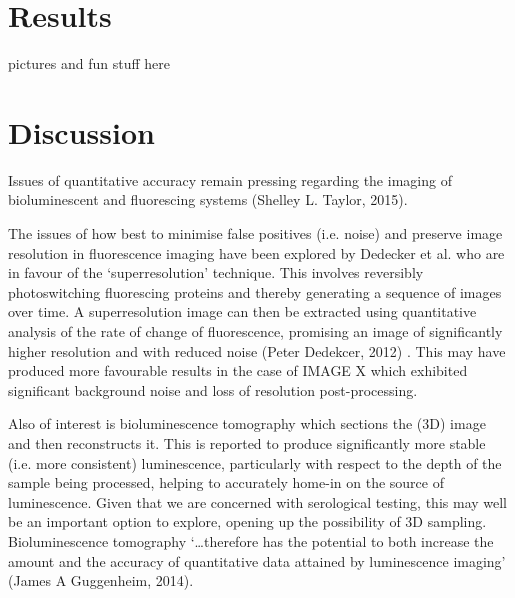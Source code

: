 \documentclass{article}
\begin{document}
\begin{article}

\section{Results}

pictures and fun stuff here



\section{Discussion}

Issues of quantitative accuracy remain pressing regarding the imaging of bioluminescent and fluorescing systems (Shelley L. Taylor, 2015). \par
The issues of how best to minimise false positives (i.e. noise) and preserve image resolution in fluorescence imaging have been explored by Dedecker et al. who are in favour of the ‘superresolution’ technique. This involves reversibly photoswitching fluorescing proteins and thereby generating a sequence of images over time. A superresolution image can then be extracted using quantitative analysis of the rate of change of fluorescence, promising an image of significantly higher resolution and with reduced noise (Peter Dedekcer, 2012) . This may have produced more favourable results in the case of IMAGE X which exhibited significant background noise and loss of resolution post-processing.\par
Also of interest is bioluminescence tomography which sections the (3D) image and then reconstructs it. This is reported to produce significantly more stable (i.e. more consistent) luminescence, particularly with respect to the depth of the sample being processed, helping to accurately home-in on the source of luminescence. Given that we are concerned with serological testing, this may well be an important option to explore, opening up the possibility of 3D sampling. Bioluminescence tomography ‘…therefore has the potential to both increase the amount and the accuracy of quantitative data attained by luminescence imaging’ (James A Guggenheim, 2014).
\par



\end{article}
\end{document}
